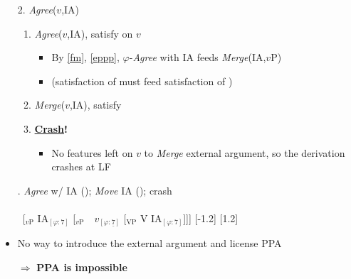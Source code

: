\documentclass[letterpaper,10pt]{handout_nick}
\begin{document}
\begin{itemize}
\item[2.] \emph{Agree}($v$,IA)
\begin{enumerate}
\item \emph{Agree}($v$,IA), satisfy \fa{$\varphi$} on $v$
\begin{itemize}
\item By \ref{fm}, \ref{eppp}, $\varphi$-\emph{Agree} with IA feeds \emph{Merge}(IA,$v$P) 
\item (satisfaction of \fa{$\varphi$} must feed satisfaction of \fm{$\varphi$})
\end{itemize}
\item \emph{Merge}($v$,IA), satisfy \fm{$\varphi$}
\item \textbf{\underline{Crash}!}
\begin{itemize}
\item No features left on $v$ to \emph{Merge} external argument, so the derivation crashes at LF 
\end{itemize}
\end{enumerate}
\ex. \emph{Agree} w/ IA (\fas{$\varphi$}); \emph{Move} IA (\fms{$\varphi$}); crash\\\\
\ [$_\text{$v$P}$ \hspace*{-.3cm}IA$_{[\varphi:7]}$ [$_\text{$v$P}$\ \ \hspace*{-.2cm}\hspace*{-.2cm}$v_{[\varphi:\underline{7}]}$ [$_\text{VP}$ V \hspace*{-.3cm}IA$_{[\varphi:7]}$]]]
[-1.2]
[1.2]\\

\item No way to introduce the external argument and license PPA
\item[$\Rightarrow$] \textbf{PPA is impossible}

\end{itemize}
\end{document}
